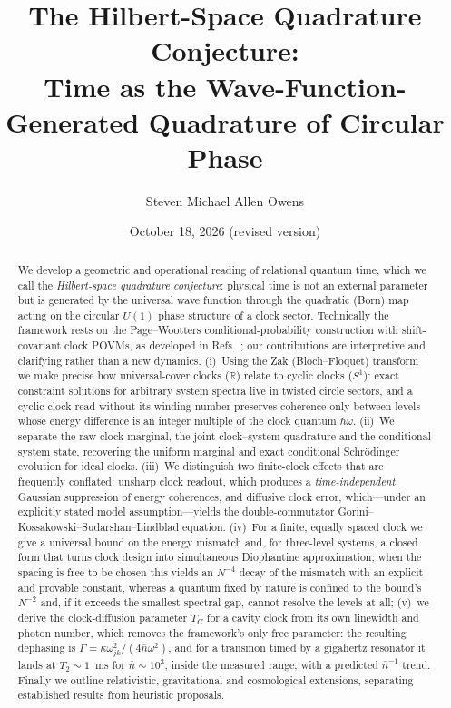 \documentclass[aps,prd,onecolumn,notitlepage,10pt,amsmath,amssymb,amsfonts,nofootinbib]{revtex4-2}
\theoremstyle{definition}
\theoremstyle{remark}
\newcommand{\R}{\mathbb{R}}
\begin{document}
\title{The Hilbert-Space Quadrature Conjecture:\\
Time as the Wave-Function-Generated Quadrature of Circular Phase}

\author{Steven Michael Allen Owens}

\date{October 18, 2026 (revised version)}

\begin{abstract}
We develop a geometric and operational reading of relational quantum time, which we call the \emph{Hilbert-space quadrature conjecture}: physical time is not an external parameter but is generated by the universal wave function through the quadratic (Born) map acting on the circular $U(1)$ phase structure of a clock sector. Technically the framework rests on the Page--Wootters conditional-probability construction with shift-covariant clock POVMs, as developed in Refs.~\cite{SmithAhmadi2019,Hohn2021,LoveridgeMiyadera2019}; our contributions are interpretive and clarifying rather than a new dynamics. (i)~Using the Zak (Bloch--Floquet) transform we make precise how universal-cover clocks ($\R$) relate to cyclic clocks ($S^1$): exact constraint solutions for arbitrary system spectra live in twisted circle sectors, and a cyclic clock read without its winding number preserves coherence only between levels whose energy difference is an integer multiple of the clock quantum $\hbar\omega$. (ii)~We separate the raw clock marginal, the joint clock--system quadrature and the conditional system state, recovering the uniform marginal and exact conditional Schr\"odinger evolution for ideal clocks. (iii)~We distinguish two finite-clock effects that are frequently conflated: unsharp clock readout, which produces a \emph{time-independent} Gaussian suppression of energy coherences, and diffusive clock error, which---under an explicitly stated model assumption---yields the double-commutator Gorini--Kossakowski--Sudarshan--Lindblad equation. (iv)~For a finite, equally spaced clock we give a universal bound on the energy mismatch and, for three-level systems, a closed form that turns clock design into simultaneous Diophantine approximation; when the spacing is free to be chosen this yields an $N^{-4}$ decay of the mismatch with an explicit and provable constant, whereas a quantum fixed by nature is confined to the bound's $N^{-2}$ and, if it exceeds the smallest spectral gap, cannot resolve the levels at all; (v)~we derive the clock-diffusion parameter $T_C$ for a cavity clock from its own linewidth and photon number, which removes the framework's only free parameter: the resulting dephasing is $\Gamma=\kappa\omega_{jk}^2/(4\bar n\omega^2)$, and for a transmon timed by a gigahertz resonator it lands at $T_2\sim1$~ms for $\bar n\sim10^3$, inside the measured range, with a predicted $\bar n^{-1}$ trend. Finally we outline relativistic, gravitational and cosmological extensions, separating established results from heuristic proposals.
\end{abstract}
\end{document}
